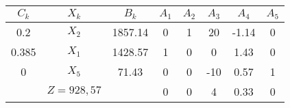     \begin{tabular}{cccccccc}
    \hline
    \hline
    $C_k$   & $X_k$   & $B_k$   & $A_1$   & $A_2$   & $A_3$   & $A_4$   & $A_5$ \bigstrut\\
    \hline
    0.2     & $X_2$   & 1857.14 & 0       & 1       & 20      & -1.14   & 0 \bigstrut[t]\\
    0.385   & $X_1$   & 1428.57 & 1       & 0       & 0       & 1.43    & 0 \\
    0       & $X_5$   & 71.43   & 0       & 0       & -10     & 0.57    & 1 \bigstrut[b]\\
    \hline
            & $Z=928,57$ &         & 0       & 0       & 4       & 0.33    & 0 \bigstrut\\
    \hline
    \hline
    \end{tabular}%
